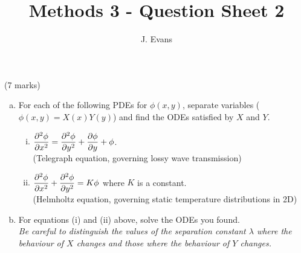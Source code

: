 \documentclass[12pt]{article}
\title{Methods 3 - Question Sheet 2}
\author{J. Evans}
\date{}
\begin{document}
\maketitle

\begin{question}(7 marks)\\
\begin{enumerate}[(a)]
\item For each of the following PDEs for $\phi(x,y)$, separate variables ($\phi(x,y)=X(x)Y(y)$) and find the ODEs satisfied by $X$ and $Y$.
\begin{enumerate}[(i)]
\item $\dfrac{\partial^2 \phi}{\partial x^2}=\dfrac{\partial^2 \phi}{\partial y^2}+\dfrac{\partial \phi}{\partial y}+\phi$.\\
(Telegraph equation, governing lossy wave transmission)
\item $\dfrac{\partial^2 \phi}{\partial x^2}+\dfrac{\partial^2 \phi}{\partial y^2}=K\phi$ where $K$ is a constant.\\
(Helmholtz equation, governing static temperature distributions in 2D)
\end{enumerate}
\item For equations (i) and (ii) above, solve the ODEs you found.\\
{\em Be careful to distinguish the values of the separation constant $\lambda$ where the behaviour of $X$ changes and those where the behaviour of $Y$ changes.}
\end{enumerate}
\end{question}
\end{document}
